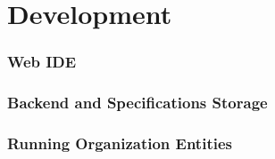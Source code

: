 \chapter{Development}

\subsection{Web IDE}
\subsection{Backend and Specifications Storage}
\subsection{Running Organization Entities}
